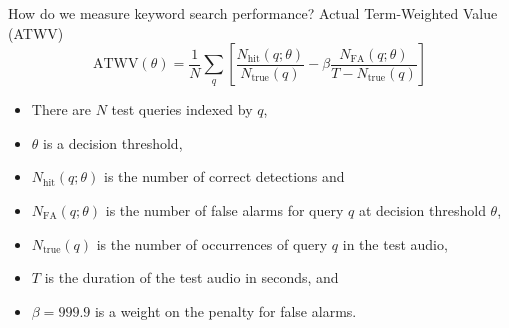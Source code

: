 \begin{frame}{How do we measure keyword search performance?}
  {Actual Term-Weighted Value (ATWV)}
  \begin{equation*}
    \text{ATWV}(\theta) = \frac{1}{N}\sum_{q}
    \left[
      \frac{N_{\text{hit}}(q;\theta)}{N_{\text{true}}(q)} -
      \beta \frac{N_{\text{FA}}(q;\theta)}{T - N_{\text{true}}(q)}
      \right]
  \end{equation*}
  \begin{itemize}
  \item There are $N$ test queries indexed by $q$,
  \item $\theta$ is a decision threshold,
  \item $N_{\text{hit}}(q;\theta)$ is the number of correct detections and
  \item $N_{\text{FA}}(q;\theta)$ is the number of false alarms for
    query $q$ at decision threshold $\theta$, 
  \item $N_{\text{true}}(q)$ is the number of occurrences of query $q$
    in the test audio,
  \item $T$ is the duration of the test audio in seconds, and
  \item $\beta = 999.9$ is a weight on the penalty for false alarms.
  \end{itemize}
\end{frame}

